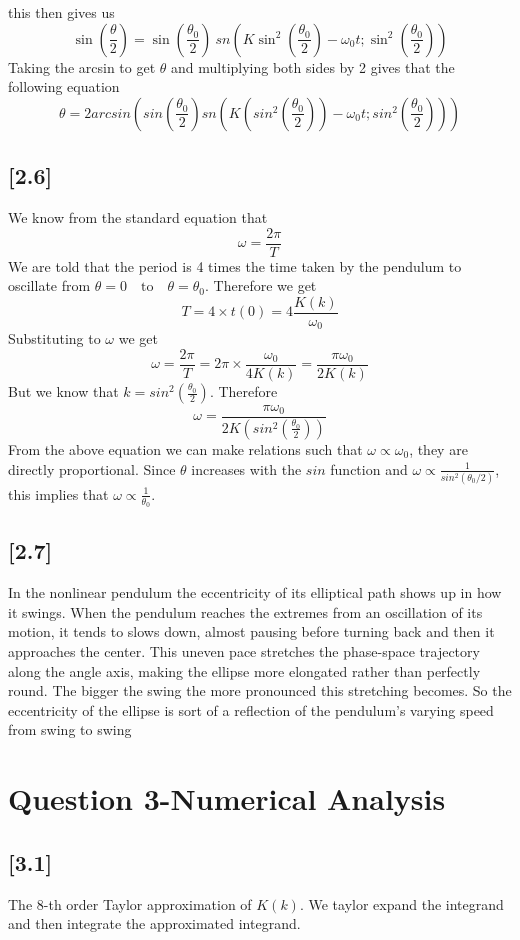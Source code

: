 \documentclass{WitsHomework}
\begin{document}
\noindent this then gives us
\[
\sin\left(\frac{\theta}{2}\right)
= \sin\left(\frac{\theta_0}{2}\right)
\ sn\left(
K \sin^2\left(\frac{\theta_0}{2}\right)
- \omega_0 t ;\sin^2\left(\frac{\theta_0}{2}\right)
\right)
\]
Taking the arcsin to get $\theta$ and multiplying both sides by 2 gives that the following equation
$$\theta=2arcsin\left(sin\left(\frac{\theta_0}{2}\right)sn\left(K\left(sin^2\left(\frac{\theta_0}{2}\right)\right)-\omega_0t;sin^2\left(\frac{\theta_0}{2}\right)\right)\right)$$
\subsection*{[2.6]}
We know from the standard equation that
$$\omega=\frac{2\pi}{T}$$
We are told that the period is 4 times the time taken by the pendulum to oscillate from $\theta=0 \quad\text{to}\quad \theta=\theta_0$. Therefore we get
$$T=4\times t(0)=4\frac{K(k)}{\omega_0}$$
Substituting to $\omega$ we get
$$\omega=\frac{2 \pi}{T}=2\pi \times \frac{\omega_0}{4 K(k)}=\frac{\pi \omega_0}{2K(k)}$$
But we know that $k=sin^2\left(\frac{\theta_0}{2}\right)$. Therefore
$$\omega=\frac{\pi \omega_0}{2K(sin^2\left(\frac{\theta_0}{2}\right))}$$
From the above equation we can make relations such that $\omega \propto \omega_0$, they are directly proportional. Since $\theta$ increases with the $sin$ function and $\omega \propto \frac{1}{sin^2(\theta_0/2)}$, this implies that $\omega \propto \frac{1}{\theta_0}$. 
\subsection*{[2.7]}
In the nonlinear pendulum the eccentricity of its elliptical path shows up in how it swings. When the pendulum reaches the extremes from an oscillation of its motion, it tends to slows down, almost pausing before turning back and then it approaches the center. This uneven pace stretches the phase-space trajectory along the angle axis, making the ellipse more elongated rather than perfectly round. The bigger the swing the more pronounced this stretching becomes. So the eccentricity of the ellipse is sort of a reflection of the pendulum’s varying speed from swing to swing
\section*{Question 3-Numerical Analysis}
\subsection*{[3.1]}
The 8-th order Taylor approximation of $K(k)$. We taylor expand the integrand and then integrate the approximated integrand. \\
\end{document}
